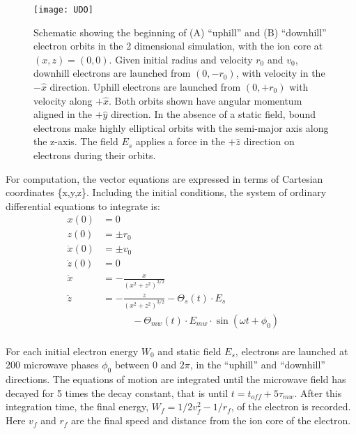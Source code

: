 \documentclass[aps,pra,reprint,groupedaddress]{revtex4-1}
\begin{document}
\begin{figure}
	\texttt{[image: UDO]}
	\caption{Schematic showing the beginning of (A) ``uphill'' and (B) ``downhill'' electron orbits in the 2 dimensional simulation, with the ion core at $(x, z) = (0, 0)$. Given initial radius and velocity $r_0$ and $v_0$, downhill electrons are launched from $(0, -r_0)$, with velocity in the $-\hat{x}$ direction. Uphill electrons are launched from $(0, +r_0)$ with velocity along $+\hat{x}$. Both orbits shown have angular momentum aligned in the $+\hat{y}$ direction. In the absence of a static field, bound electrons make highly elliptical orbits with the semi-major axis along the z-axis. The field $E_s$ applies a force in the $+\hat{z}$ direction on electrons during their orbits.}
	\label{fig:udo}
\end{figure}

For computation, the vector equations are expressed in terms of Cartesian coordinates \{x,y,z\}. Including the initial conditions, the system of ordinary differential equations to integrate is:
\begin{equation}
\begin{aligned}
x(0) & = 0 \\
z(0) & = \pm r_0 \\
\dot{x}(0) & = \pm v_0 \\
\dot{z}(0) & = 0 \\
\ddot{x} & = -\frac{x}{(x^2 + z^2)^{3/2}} \\
\ddot{z} & = -\frac{z}{(x^2 + z^2)^{3/2}} - \Theta_s(t) \cdot E_s \\
 & \quad \quad \quad - \Theta_{mw}(t) \cdot E_{mw} \cdot \sin{(\omega t + \phi_0)} & & \\
\end{aligned}
\end{equation}

For each initial electron energy $W_0$ and static field $E_s$, electrons are launched at 200 microwave phases $\phi_0$ between 0 and $2\pi$, in the ``uphill'' and ``downhill'' directions. The equations of motion are integrated until the microwave field has decayed for 5 times the decay constant, that is until  $t=t_{off} + 5\tau_{mw}$. After this integration time, the final energy, $W_f = 1/2 v_f^2 - 1/r_f$, of the electron is recorded. Here $v_f$ and $r_f$ are the final speed and distance from the ion core of the electron.
\end{document}
